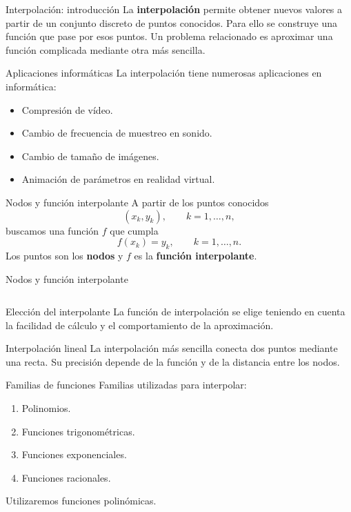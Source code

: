 \documentclass[original_version/main.tex]{subfiles}
\begin{document}
\graphicspath{{imagenes/tema9/}{../imagenes/tema9/}}

\begin{frame}[t]{Interpolación: introducción}
La \textbf{interpolación} permite obtener nuevos valores a partir de un conjunto discreto de puntos conocidos.
\bigskip
Para ello se construye una función que pase por esos puntos.
\bigskip
Un problema relacionado es aproximar una función complicada mediante otra más sencilla.
\end{frame}
\begin{frame}[t]{Aplicaciones informáticas}
La interpolación tiene numerosas aplicaciones en informática:
\begin{itemize}
\item Compresión de vídeo.
\item Cambio de frecuencia de muestreo en sonido.
\item Cambio de tamaño de imágenes.
\item Animación de parámetros en realidad virtual.
\end{itemize}
\end{frame}
\begin{frame}[t]{Nodos y función interpolante}
A partir de los puntos conocidos
\[(x_k,y_k),\qquad k=1,\ldots,n,\]
buscamos una función $f$ que cumpla
\[f(x_k)=y_k,\qquad k=1,\ldots,n.\]
Los puntos son los \textbf{nodos} y $f$ es la \textbf{función interpolante}.
\end{frame}
\begin{frame}[t]{Nodos y función interpolante}
\begin{columns}\end{columns}
\end{frame}
\begin{frame}[t]{Elección del interpolante}
La función de interpolación se elige teniendo en cuenta la facilidad de cálculo y el comportamiento de la aproximación.
\end{frame}
\begin{frame}[t]{Interpolación lineal}
La interpolación más sencilla conecta dos puntos mediante una recta.
\medskip
Su precisión depende de la función y de la distancia entre los nodos.
\end{frame}
\begin{frame}[t]{Familias de funciones}
Familias utilizadas para interpolar:
\begin{enumerate}
\item Polinomios.
\item Funciones trigonométricas.
\item Funciones exponenciales.
\item Funciones racionales.
\end{enumerate}
\bigskip
Utilizaremos funciones polinómicas.
\end{frame}
\end{document}
